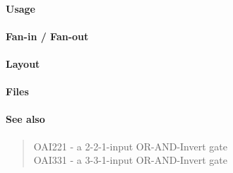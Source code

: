 \paragraph{Usage}

\paragraph{Fan-in / Fan-out}

\paragraph{Layout}

\paragraph{Files}

\paragraph{See also}
\begin{quote}
    OAI221 - a 2-2-1-input OR-AND-Invert gate \\
    OAI331 - a 3-3-1-input OR-AND-Invert gate
\end{quote}
